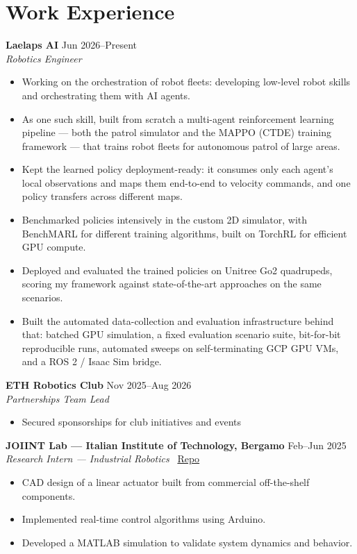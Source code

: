 \documentclass[a4paper,10pt]{article}
\begin{document}
\cvheader


\section*{Work Experience}
\textbf{Laelaps AI} \hfill Jun 2026--Present\\
\textit{Robotics Engineer}
\vspace{-5pt}
\begin{itemize}
    \item Working on the orchestration of robot fleets: developing low-level robot skills and orchestrating them with AI agents.
    \item As one such skill, built from scratch a multi-agent reinforcement learning pipeline --- both the patrol simulator and the MAPPO (CTDE) training framework --- that trains robot fleets for autonomous patrol of large areas.
    \item Kept the learned policy deployment-ready: it consumes only each agent's local observations and maps them end-to-end to velocity commands, and one policy transfers across different maps.
    \item Benchmarked policies intensively in the custom 2D simulator, with BenchMARL for different training algorithms, built on TorchRL for efficient GPU compute.
    \item Deployed and evaluated the trained policies on Unitree Go2 quadrupeds, scoring my framework against state-of-the-art approaches on the same scenarios.
    \item Built the automated data-collection and evaluation infrastructure behind that: batched GPU simulation, a fixed evaluation scenario suite, bit-for-bit reproducible runs, automated sweeps on self-terminating GCP GPU VMs, and a ROS 2 / Isaac Sim bridge.
\end{itemize}

\textbf{ETH Robotics Club} \hfill Nov 2025--Aug 2026\\
\textit{Partnerships Team Lead}
\vspace{-5pt}
\begin{itemize}
    \item Secured sponsorships for club initiatives and events
\end{itemize}

\textbf{JOIINT Lab — Italian Institute of Technology, Bergamo} \hfill Feb--Jun 2025\\
\textit{Research Intern — Industrial Robotics} 
\faGithub\ \href{https://github.com/alessiosalvatore1703-ops/Linear-Actuator}{Repo}
\vspace{-5pt}
\begin{itemize} 
    \item CAD design of a linear actuator built from commercial off-the-shelf components. 
    \item Implemented real-time control algorithms using Arduino. 
    \item Developed a MATLAB simulation to validate system dynamics and behavior. 
\end{itemize}
\end{document}
